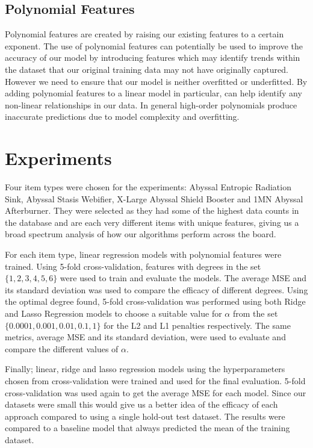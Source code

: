 \documentclass[10pt]{article}
\begin{document}
	\subsection{Polynomial Features}
		Polynomial features are created by raising our existing features to a certain exponent. The use of polynomial features can potentially be used to improve the accuracy of our model by introducing features which may identify trends within the dataset that our original training data may not have originally captured. However we need to ensure that our model is neither overfitted or underfitted. By adding polynomial features to a linear model in particular, can help identify any non-linear relationships in our data. In general high-order polynomials produce inaccurate predictions due to model complexity and overfitting.
		
\section{Experiments}
	Four item types were chosen for the experiments: Abyssal Entropic Radiation Sink, Abyssal Stasis Webifier, X-Large Abyssal Shield Booster and 1MN Abyssal Afterburner. They were selected as they had some of the highest data counts in the database and are each very different items with unique features, giving us a broad spectrum analysis of how our algorithms perform across the board.
	
	For each item type, linear regression models with polynomial features were trained. Using 5-fold cross-validation, features with degrees in the set $\lbrace 1, 2, 3, 4, 5, 6 \rbrace$ were used to train and evaluate the models. The average MSE and its standard deviation was used to compare the efficacy of different degrees. Using the optimal degree found, 5-fold cross-validation was performed using both Ridge and Lasso Regression models to choose a suitable value for $\alpha$ from the set $\lbrace 0.0001, 0.001, 0.01, 0.1, 1 \rbrace$ for the L2 and L1 penalties respectively. The same metrics, average MSE and its standard deviation, were used to evaluate and compare the different values of $\alpha$.
	
	Finally; linear, ridge and lasso regression models using the hyperparameters chosen from cross-validation were trained and used for the final evaluation. 5-fold cross-validation was used again to get the average MSE for each model. Since our datasets were small this would give us a better idea of the efficacy of each approach compared to using a single hold-out test dataset. The results were compared to a baseline model that always predicted the mean of the training dataset.
	
\end{document}
